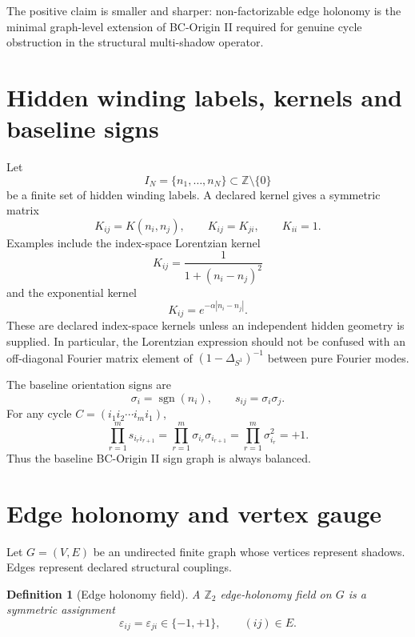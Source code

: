 \documentclass[11pt]{article}
\newtheorem{definition}{Definition}
\newcommand{\sgn}{\operatorname{sgn}}
\begin{document}
The positive claim is smaller and sharper: non-factorizable edge holonomy is the minimal graph-level extension of BC-Origin II required for genuine cycle obstruction in the structural multi-shadow operator.

\section{Hidden winding labels, kernels and baseline signs}

Let
\begin{equation}
 I_N=\{n_1,\ldots,n_N\}\subset \mathbb Z\setminus\{0\}
\end{equation}
be a finite set of hidden winding labels. A declared kernel gives a symmetric matrix
\begin{equation}
 K_{ij}=K(n_i,n_j),\qquad K_{ij}=K_{ji},\qquad K_{ii}=1.
\end{equation}
Examples include the index-space Lorentzian kernel
\begin{equation}
 K_{ij}=\frac{1}{1+(n_i-n_j)^2}
\end{equation}
and the exponential kernel
\begin{equation}
 K_{ij}=e^{-\alpha |n_i-n_j|}.
\end{equation}
These are declared index-space kernels unless an independent hidden geometry is supplied. In particular, the Lorentzian expression should not be confused with an off-diagonal Fourier matrix element of $(1-\Delta_{S^1})^{-1}$ between pure Fourier modes.

The baseline orientation signs are
\begin{equation}
 \sigma_i=\sgn(n_i),\qquad s_{ij}=\sigma_i\sigma_j.
\end{equation}
For any cycle $C=(i_1i_2\cdots i_m i_1)$,
\begin{equation}
 \prod_{r=1}^{m}s_{i_r i_{r+1}}
 =\prod_{r=1}^{m}\sigma_{i_r}\sigma_{i_{r+1}}
 =\prod_{r=1}^{m}\sigma_{i_r}^{2}=+1.
\end{equation}
Thus the baseline BC-Origin II sign graph is always balanced.

\section{Edge holonomy and vertex gauge}

Let $G=(V,E)$ be an undirected finite graph whose vertices represent shadows. Edges represent declared structural couplings.

\begin{definition}[Edge holonomy field]
A $\mathbb Z_2$ edge-holonomy field on $G$ is a symmetric assignment
\begin{equation}
 \varepsilon_{ij}=\varepsilon_{ji}\in\{-1,+1\},\qquad (ij)\in E.
\end{equation}
\end{definition}
\end{document}

